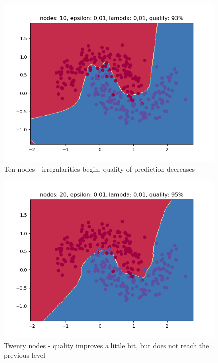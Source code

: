 \documentclass[3p,twocolumn]{elsarticle}
\begin{document}
\begin{figure}[h!]
\label{fig:fig5}
  \includegraphics[width=\linewidth]{wykresy/19.png}
	\caption{ Ten nodes - irregularities begin, quality of prediction decreases}
	\label{fig5}
\end{figure}

\begin{figure}[h!]
\label{fig:fig5}
  \includegraphics[width=\linewidth]{wykresy/20.png}
	\caption{ Twenty nodes - quality improves a little bit, but does not reach the previous level}
	\label{fig5}
\end{figure}
\end{document}
